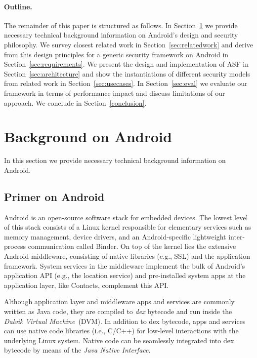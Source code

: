 \documentclass[letterpaper,twocolumn,10pt]{article}
\newcommand{\OURSHORT}{\textsc{ASF}\xspace}
\begin{document}
\paragraph{Outline.}

The remainder of this paper is structured as follows. In Section~\ref{sec:background} we provide necessary technical background information on Android's design and security philosophy. We survey closest related work in Section~\ref{sec:relatedwork} and derive from this design principles for a generic security framework on Android in Section~\ref{sec:requirements}. We present the design and implementation of \OURSHORT in Section~\ref{sec:architecture} and show the instantiations of different security models from related work in Section~\ref{sec:usecases}. In Section~\ref{sec:eval} we evaluate our framework in terms of performance impact and discuss limitations of our approach. We conclude in Section~\ref{conclusion}.
 
\section{Background on Android}
\label{sec:background}
In this section we provide necessary technical background information on Android.

\subsection{Primer on Android}
\label{sec:primerandroid}

Android is an open-source software stack for embedded devices. The lowest level of this stack consists of a Linux kernel responsible for elementary services such as memory management, device drivers, and an Android-specific lightweight inter-process communication called Binder. On top of the kernel lies the extensive Android middleware, consisting of native libraries (e.g., SSL) and the application framework. System services in the middleware implement the bulk of Android's application API (e.g., the location service) and pre-installed system apps at the application layer, like Contacts, complement this API.

Although application layer and middleware apps and services are commonly written as Java code, they are compiled to \textit{dex} bytecode and run inside the \textit{Dalvik Virtual Machine}~(DVM). In addition to dex bytecode, apps and services can use native code libraries (i.e., C/C++) for low-level interactions with the underlying Linux system. Native code can be seamlessly integrated into dex bytecode by means of the \textit{Java Native Interface}.
\end{document}
